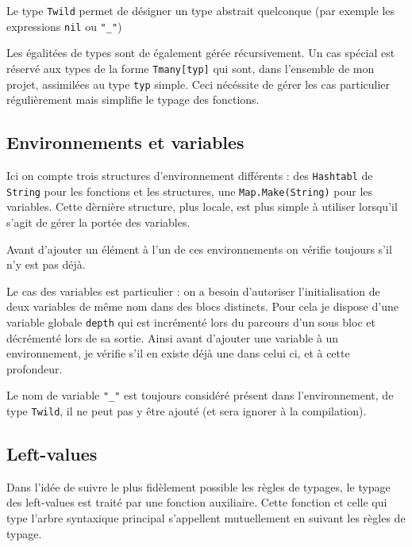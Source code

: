 \documentclass[11pt,a4paper]{article}
\begin{document}
Le type \verb|Twild| permet de désigner un type abstrait quelconque (par exemple les expressions \verb|nil| ou \verb|"_"|)

Les égalitées de types sont de également gérée récursivement. Un cas spécial est réservé aux types de la forme \verb|Tmany[typ]| qui sont, dans l'ensemble de mon projet, assimilées au type \verb|typ| simple. Ceci nécéssite de gérer les cas particulier régulièrement mais simplifie le typage des fonctions.

\subsection{Environnements et variables}

Ici on compte trois structures d'environnement différents : des \verb|Hashtabl| de \verb|String| pour les fonctions et les structures, une \verb|Map.Make(String)| pour les variables. Cette dèrnière structure, plus locale, est plus simple à utiliser lorsqu'il s'agit de gérer la portée des variables.

Avant d'ajouter un élément à l'un de ces environnements on vérifie toujours s'il n'y est pas déjà.

Le cas des variables est particulier : on a besoin d'autoriser l'initialisation de deux variables de même nom dans des blocs distincts. Pour cela je dispose d'une variable globale \verb|depth| qui est incrémenté lors du parcours d'un sous bloc et décrémenté lors de sa sortie. Ainsi avant d'ajouter une variable à un environnement, je vérifie s'il en existe déjà une dans celui ci, et à cette profondeur.

Le nom de variable \verb|"_"| est toujours considéré présent dans l'environnement, de type \verb|Twild|, il ne peut pas y être ajouté (et sera ignorer à la compilation).

\subsection{Left-values}

Dans l'idée de suivre le plus fidèlement possible les règles de typages, le typage des left-values est traité par une fonction auxiliaire. Cette fonction et celle qui type l'arbre syntaxique principal s'appellent mutuellement en suivant les règles de typage.
\end{document}
